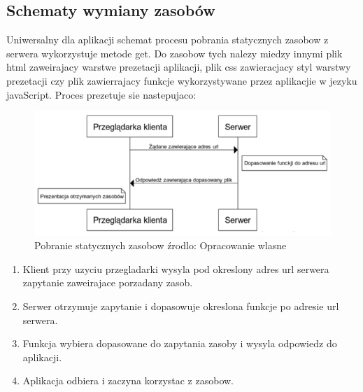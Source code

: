 \documentclass[12pt]{report}
\begin{document}
\subsection{Schematy wymiany zasobów}
Uniwersalny dla aplikacji schemat procesu pobrania statycznych zasobow z serwera wykorzystuje metode get. Do zasobow tych nalezy miedzy innymi plik html zaweirajacy warstwe prezetacji aplikacji, plik css zawieracjacy styl warstwy prezetacji czy plik zawierrajacy funkcje wykorzystywane przez aplikacjie w jezyku javaScript. Proces prezetuje sie nastepujaco:
\begin{figure}[!hb]
\centering
\includegraphics[width=\textwidth,height=\textheight,keepaspectratio]{K-S.png} 
\caption{Pobranie statycznych zasobow źrodlo: Opracowanie wlasne}
\end{figure}
\begin{enumerate}
\item Klient przy uzyciu przegladarki wysyla pod okreslony adres url serwera zapytanie zaweirajace porzadany zasob.
\item Serwer otrzymuje zapytanie i dopasowuje okreslona funkcje po adresie url serwera.
\item Funkcja wybiera dopasowane do zapytania zasoby i wysyla odpowiedz do aplikacji.
\item Aplikacja odbiera i zaczyna korzystac z zasobow.
\end{enumerate}
\end{document}
